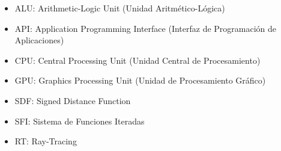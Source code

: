 \begin{itemize}
\item ALU: Arithmetic-Logic Unit (Unidad Aritmético-Lógica)
\item API: Application Programming Interface (Interfaz de Programación de Aplicaciones)
\item CPU: Central Processing Unit (Unidad Central de Procesamiento)
\item GPU: Graphics Processing Unit (Unidad de Procesamiento Gráfico)
\item SDF: Signed Distance Function
\item SFI: Sistema de Funciones Iteradas
\item RT: Ray-Tracing
\end{itemize}